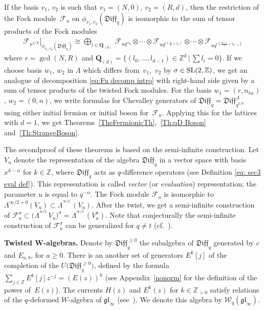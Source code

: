 \documentclass[pdftex]{sigma}
\numberwithin{equation}{section}
\theoremstyle{definition}
\newcommand{\qd}[1]{ \mathfrak{Diff}_{q^{#1}} }
\newcommand{\qD}{\mathfrak{Diff}_q}
\newcommand{\siL}{ \Lambda^{^{\! \infty/2}} \,}
\begin{document}
If the basis $v_1$, $v_2$ is such that $v_1=(N,0)$, $v_2=(R,d)$, then the restriction of the Fock module~$\mathcal{F}_u$ on $\phi_{v_1,v_2}(\qD)$ is isomorphic to the sum of tensor products of the Fock modules
\begin{align} \label{eq:Fu decomp intro}
\left. \mathcal{F}_{u^{1/N}} \right|_{\phi_{v_1,v_2}(\qD)} \cong \bigoplus_{ l \in \mathbf{Q}_{(d)}} \ \mathcal{F}_{u q^{ rl_0}} \otimes \cdots \otimes \mathcal{F}_{u q^{r\left(\frac{\alpha}{n}+ l_{\alpha} \right)
}} \otimes \cdots \otimes \mathcal{F}_{u q^{r \left(\frac{d-1}{d}+ l_{d-1} \right)}}
\end{align}
where $r=\gcd(N,R)$ and $\mathbf{Q}_{(d)}=\{(l_0,\dots,l_{d-1})\in \mathbb{Z}^d\,|\,\sum l_i=0\}$. If we choose basis $w_1$, $w_2$ in $\Lambda$ which differs from~$v_1$,~$v_2$ by $\sigma\in {\rm SL}(2,\mathbb{Z})$, we get an analogue of decomposition \eqref{eq:Fu decomp intro} with right-hand side given by a sum of tensor products of the twisted Fock modules. For the basis $w_1=(r,n_{tw})$, $w_2=(0,n)$, we write formulas for Chevalley generators of $\qD = \qd{1/n}^{\Lambda}$ using either initial fermion or initial boson for~$\mathcal{F}_u$. Applying this for the lattices with $d=1$, we get Theorems~\ref{TheFermionicTh},~\ref{Th:qD Boson} and~\ref{Th:StrangeBoson}.

The secondproof of these theorems is based on the semi-infinite construction. Let $V_{u}$ denote the representation of the algebra $\qD$ in a vector space with basis $x^{k-\alpha}$ for $k \in \mathbb{Z}$, where $\qD$ acts as $q$-difference operators (see Definition \ref{eq: sec3 eval def}). This representation is called \emph{vector} (or \emph{evaluation}) representation; the parameter $u$ is equal to $q^{-\alpha}$. The Fock module $\mathcal{F}_u$ is isomorphic to $\Lambda^{\infty/2+0}(V_u)\subset \siL (V_u)$. After the twist, we get a semi-infinite construction of $\mathcal{F}_u^{\sigma} \subset \big(\siL V_u\big)^{\sigma}= \siL (V_u^{\sigma})$. Note that conjecturally the semi-infinite construction of $\mathcal{F}_u^\sigma$ can be generalized for $q\neq t$ (cf.~\cite{FFJMMa}).

{\bf Twisted $\boldsymbol{W}$-algebras.} Denote by $\qD^{\geqslant0}$ the subalgebra of $\qD$ generated by $c$ and $E_{a,b}$, for $a\geqslant 0$. There is an another set of generators $E^k[j]$ of the completion of the $U\big(\qD^{\geqslant 0}\big)$, defined by the formula $\sum\limits_{j \in \mathbb{Z}} E^k[j]z^{-j}= ( E (z) )^k$ (see Appendix~\ref{nonorm} for the definition of the power of~$E(z)$). The currents $H(z)$ and $E^k(z)$ for $k\in \mathbb{Z}_{>0}$ satisfy relations of the $q$-deformed $W$-algebra of $\mathfrak{gl}_\infty$ (see~\cite{N16}). We denote this algebra by $\mathcal{W}_q(\mathfrak{gl}_\infty)$.
\end{document}
